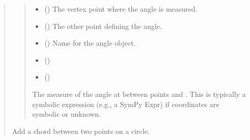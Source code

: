 \documentclass[letterpaper,10pt,english]{sphinxmanual}
\begin{document}
\begin{quote}
\begin{fulllineitems}
\begin{fulllineitems}
\begin{quote}
\begin{description}
\begin{itemize}
\item {} 
\sphinxAtStartPar
{} () \textendash{} The vertex point where the angle is measured.

\item {} 
\sphinxAtStartPar
{} () \textendash{} The other point defining the angle.

\item {} 
\sphinxAtStartPar
{} (\sphinxstyleliteralemphasis{\sphinxupquote{{[}}}\sphinxstyleliteralemphasis{\sphinxupquote{{]}}}\sphinxstyleliteralemphasis{\sphinxupquote{, }}) \textendash{} Name for the angle object.

\item {} 
\sphinxAtStartPar
{} (\sphinxstyleliteralemphasis{\sphinxupquote{ | }})

\item {} 
\sphinxAtStartPar
{} (\sphinxstyleliteralemphasis{\sphinxupquote{ | }})

\end{itemize}

\sphinxAtStartPar
The measure of the angle at  between points  and .
This is typically a symbolic expression (e.g., a SymPy Expr) if coordinates
are symbolic or unknown.

\end{description}\end{quote}

\end{fulllineitems}


\begin{fulllineitems}
\label{\detokenize{pygeox:pygeox.add_objects.AddNamespace.chord}}
\pysigstartsignatures
\pysiglinewithargsret
{}
{\sphinxparamcomma {}\sphinxparamcomma {}\sphinxparamcomma {}}
{}
\pysigstopsignatures
\sphinxAtStartPar
Add a chord between two points on a circle.


\end{fulllineitems}
\end{fulllineitems}
\end{quote}
\end{document}

